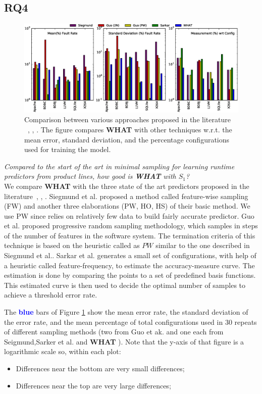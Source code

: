 \documentclass{sig-alternative}
\newcommand{\bi}{\begin{itemize}}%
\newcommand{\ei}{\end{itemize}}
\newcommand{\what}{{\bf WHAT }}
\begin{document}
 
\subsection{RQ4}

\begin{figure}[htbp]
\includegraphics[width=\linewidth]{Figures/compare_graph_h.eps}
\caption{Comparison between various approaches proposed in the literature ~\cite{siegmund2012predicting}, \cite{guo2013variability}, \cite{sarkar2015cost}. The figure compares \what with other techniques w.r.t. the mean error, standard deviation, and the percentage configurations used for training the model.}\label{fig:Comparison}
\end{figure}
 
{\em Compared to the start of the art in minimal sampling for
learning runtime predictors from product lines, how good is \what with $S_1$?}\\

We compare \what with the three state of the art predictors proposed in the literature~\cite{siegmund2012predicting}, \cite{guo2013variability}, \cite{sarkar2015cost}. Siegmund et al. proposed a method called feature-wise sampling (FW) and 
 another three elaborations (PW, HO, HS) of their basic method. We use PW since relies on relatively few data to build fairly accurate predictor. Guo et al. proposed progressive random sampling methodology, which samples in steps of the number of features in the software system. The termination criteria of this technique is based on the heuristic called as $PW$ similar to the one described in  Siegmund et al.. Sarkar et al. generates a small set of configurations, with help of a heuristic called feature-frequency,  to estimate the accuracy-measure curve. The estimation is done by comparing the points to a set of predefined basis functions. This estimated curve is then used to decide the optimal number of samples to achieve a threshold error rate.  
 
 The \textcolor{blue}{\bf blue} bars of Figure \ref{fig:Comparison} show the
 mean error rate, the standard deviation of the error rate, and the mean percentage
 of total configurations used in 30 repeats of   different sampling methods
 (two from Guo et ak.\cite{guo2013variability} and one each
 from Seigmund,Sarker et al.\cite{siegmund2012predicting,sarkar2015cost} and \what).
 Note that the y-axis of that figure is a logarithmic scale so, within each plot:
 \bi
 \item Differences near the bottom  are very small differences;
 \item Differences near the top   are very large differences;
 \ei
 
\end{document}
